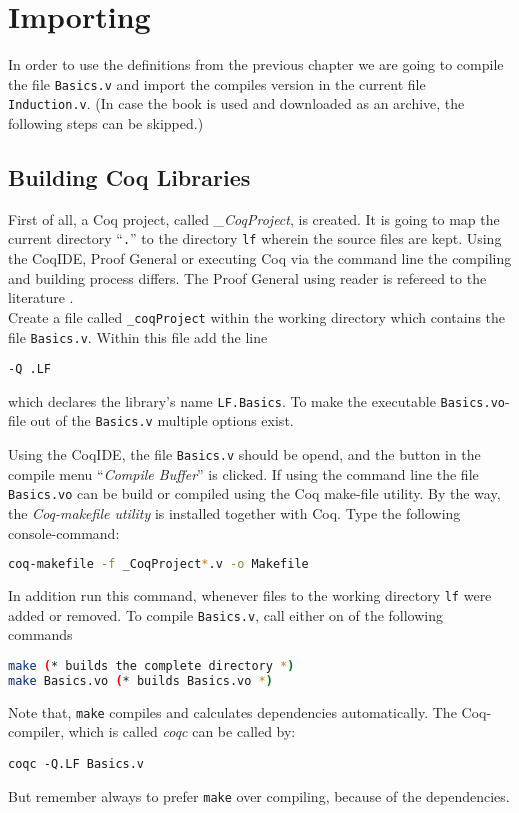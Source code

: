 \section{Importing}


In order to use the definitions from the previous chapter we are going to compile the file 
\texttt{Basics.v} and import the compiles version in the current file \texttt{Induction.v}.
(In case the book \cite{PACGGHSY} is used and downloaded as an archive, the following steps can be skipped.)   

\subsection{Building Coq Libraries}

First of all, a Coq project, called {\itshape \_CoqProject}, is created.  
It is going to map the current directory ``\texttt{.}'' to the directory \texttt{lf} wherein the source files are kept.
Using the CoqIDE, Proof General or executing Coq via the command line the compiling and building process differs.
The Proof General using reader is refereed to the literature \cite[Section, Induction, Proof by Induction]{PACGGHSY}.\\

Create a file called \texttt{\_coqProject} within the working directory which contains the file \texttt{Basics.v}.
Within this file add the line 

\begin{lstlisting}
-Q .LF
\end{lstlisting}

which declares the library's name \texttt{LF.Basics}. 
To make the executable \texttt{Basics.vo}-file out of the \texttt{Basics.v} multiple options exist.

Using the CoqIDE, the file \texttt{Basics.v} should be opend, and the button in the compile menu  ``{\itshape Compile Buffer}'' is clicked.
If using the command line the file \texttt{Basics.vo} can be build or compiled using the Coq  make-file utility.
By the way, the {\itshape Coq-makefile utility } is installed together with Coq.
Type the following console-command:
\begin{lstlisting}[language=bash]
coq-makefile -f _CoqProject*.v -o Makefile
\end{lstlisting}

In addition run this command, whenever files to the working directory \texttt{lf} were added or removed.
To compile \texttt{Basics.v}, call either on of the following commands 
\begin{lstlisting}[language=bash]
make (* builds the complete directory *)
make Basics.vo (* builds Basics.vo *)
\end{lstlisting}
Note that, \lstinline!make! compiles and calculates dependencies automatically. 
The Coq-compiler, which is called {\itshape coqc} can be called by: 
\begin{lstlisting}
coqc -Q.LF Basics.v
\end{lstlisting}
But remember always to prefer \texttt{make} over compiling, because of the dependencies.\\
 
